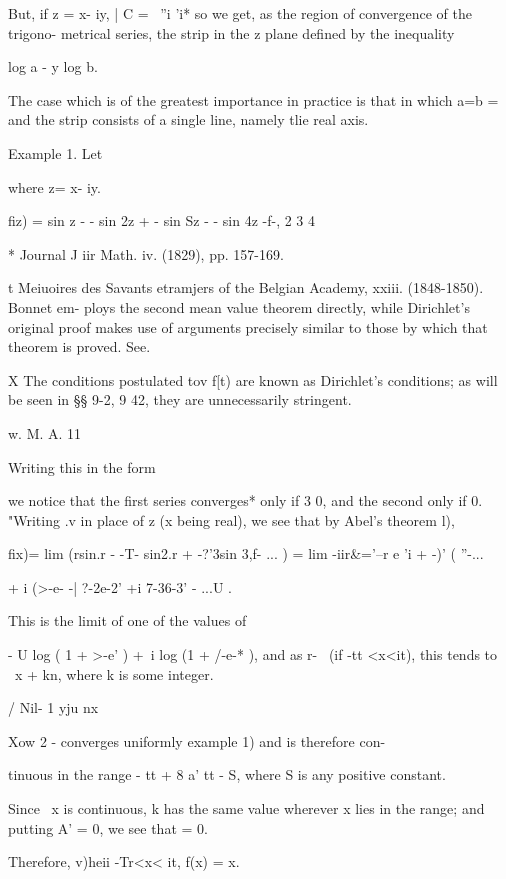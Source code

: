But, if z = x- iy, | C = ~''i 'i* so we get, as the region of
convergence of the trigono- metrical series, the strip in the z plane
defined by the inequality

log a - y log b.

The case which is of the greatest importance in practice is that in
which a=b = \, and the strip consists of a single line, namely tlie
real axis.

Example 1. Let

where z= x- iy.

fiz) = sin z - - sin 2z + - sin Sz - - sin 4z -f-,  2 3 4

* Journal J iir Math. iv. (1829), pp. 157-169.

t Meiuoires des Savants etramjers of the Belgian Academy, xxiii.
(1848-1850). Bonnet em- ploys the second mean value theorem directly,
while Dirichlet's original proof makes use of arguments precisely
similar to those by which that theorem is proved. See.

X The conditions postulated tov f[t) are known as Dirichlet's
conditions; as will be seen in §§ 9-2, 9 42, they are unnecessarily
stringent.

w. M. A. 11

%
%

Writing this in the form

we notice that the first series converges* only if 3 0, and the second
only if 0. "Writing .v in place of z (x being real), we see that by
Abel's theorem l),

fix)= lim (rsin.r - -T- sin2.r + -?'3sin 3,f- ... ) = lim -iir\&='--r
e 'i + -)' ( ''-...\

+ i (>-e- -| ?-2e-2' +i 7-36-3' - ...U .

This is the limit of one of the values of

- U log ( 1 + >-e' ) +\ i log (1 + /-e-* ), and as r- \ (if -tt
<x<it), this tends to \ x + kn, where k is some integer.

  / Nil- 1 yju nx

Xow 2 - converges uniformly  example 1) and is therefore con-

tinuous in the range - tt + 8 a' tt - S, where S is any positive
constant.

Since \ x is continuous, k has the same value wherever x lies in the
range; and putting A' = 0, we see that = 0.

Therefore, v)heii -Tr<x< it, f(x) = x.

